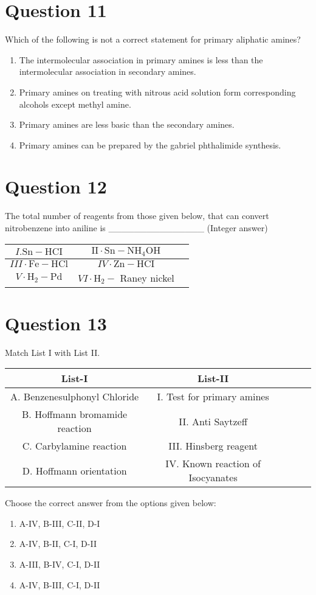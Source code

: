 \documentclass{article}
\begin{document}
\section*{Question 11}
Which of the following is not a correct statement for primary aliphatic amines? 
\begin{enumerate}[label=(\alph*)]
\item The intermolecular association in primary amines is less than the intermolecular association in secondary amines.
\item Primary amines on treating with nitrous acid solution form corresponding alcohols except methyl amine.
\item Primary amines are less basic than the secondary amines.
\item Primary amines can be prepared by the gabriel phthalimide synthesis.
\end{enumerate}
\newpage
\section*{Question 12}
The total number of reagents from those given below, that can convert nitrobenzene into aniline is _______________ (Integer answer)\begin{tabular}{|c|c|c|}
\hline
\(I . \mathrm{Sn}-\mathrm{HCI}\) & \(\mathrm{II} \cdot \mathrm{Sn}-\mathrm{NH}_4 \mathrm{OH}\) \\
\hline
\(I I I \cdot \mathrm{Fe}-\mathrm{HCl}\) & \(I V \cdot \mathrm{Zn}-\mathrm{HCI}\) \\
\hline
\(V \cdot \mathrm{H}_2-\mathrm{Pd}\) & \(V I \cdot \mathrm{H}_2-\) Raney nickel \\
\hline
\end{tabular}

\begin{enumerate}[label=(\alph*)]
\end{enumerate}
\newpage
\section*{Question 13}
Match List I with List II.\begin{tabular}{|c|c|c|c|c|}
\hline
List-I & List-II \\
\hline
A. Benzenesulphonyl Chloride & I. Test for primary amines \\
\hline
B. Hoffmann bromamide reaction & II. Anti Saytzeff \\
\hline
C. Carbylamine reaction & III. Hinsberg reagent \\
\hline
D. Hoffmann orientation & IV. Known reaction of Isocyanates \\
\hline
\end{tabular}
Choose the correct answer from the options given below: \newline
\begin{enumerate}[label=(\alph*)]
\item A-IV, B-III, C-II, D-I
\item A-IV, B-II, C-I, D-II
\item A-III, B-IV, C-I, D-II
\item A-IV, B-III, C-I, D-II
\end{enumerate}
\newpage
\end{document}
